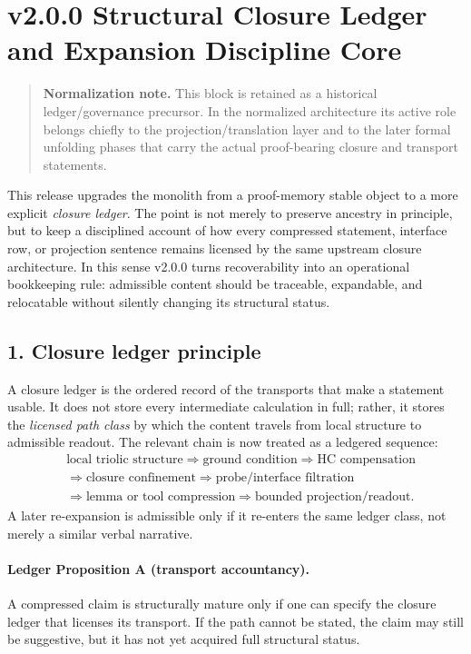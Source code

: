 \section*{v2.0.0 Structural Closure Ledger and Expansion Discipline Core}
\begin{quote}
\textbf{Normalization note.} This block is retained as a historical ledger/governance precursor. In the normalized architecture its active role belongs chiefly to the projection/translation layer and to the later formal unfolding phases that carry the actual proof-bearing closure and transport statements.
\end{quote}

This release upgrades the monolith from a proof-memory stable object to a more
explicit \emph{closure ledger}. The point is not merely to preserve ancestry in
principle, but to keep a disciplined account of how every compressed statement,
interface row, or projection sentence remains licensed by the same upstream
closure architecture. In this sense v2.0.0 turns recoverability into an
operational bookkeeping rule: admissible content should be traceable, expandable,
and relocatable without silently changing its structural status.

\subsection*{1. Closure ledger principle}
A closure ledger is the ordered record of the transports that make a statement
usable. It does not store every intermediate calculation in full; rather, it
stores the \emph{licensed path class} by which the content travels from local
structure to admissible readout. The relevant chain is now treated as a ledgered
sequence:
\[
\begin{aligned}
&\text{local triolic structure} \Longrightarrow \text{ground condition} \Longrightarrow \text{HC compensation}\\
&\Longrightarrow \text{closure confinement} \Longrightarrow \text{probe/interface filtration}\\
&\Longrightarrow \text{lemma or tool compression} \Longrightarrow \text{bounded projection/readout}.
\end{aligned}
\]
A later re-expansion is admissible only if it re-enters the same ledger class,
not merely a similar verbal narrative.

\paragraph{Ledger Proposition A (transport accountancy).}
A compressed claim is structurally mature only if one can specify the closure
ledger that licenses its transport. If the path cannot be stated, the claim may
still be suggestive, but it has not yet acquired full structural status.

